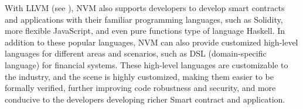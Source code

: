 With LLVM (see ), NVM also supports developers to develop
smart contracts and applications with their familiar programming languages,
such as Solidity, more flexible JavaScript, and even pure functions type of
language Haskell. In addition to these popular languages, NVM can also provide
customized high-level languages for different areas and scenarios, such as DSL
(domain-specific language) for financial systems. These high-level languages
are customizable to the industry, and the scene is highly customized, making
them easier to be formally verified, further improving code robustness and
security, and more conducive to the developers developing richer Smart contract
and application.

